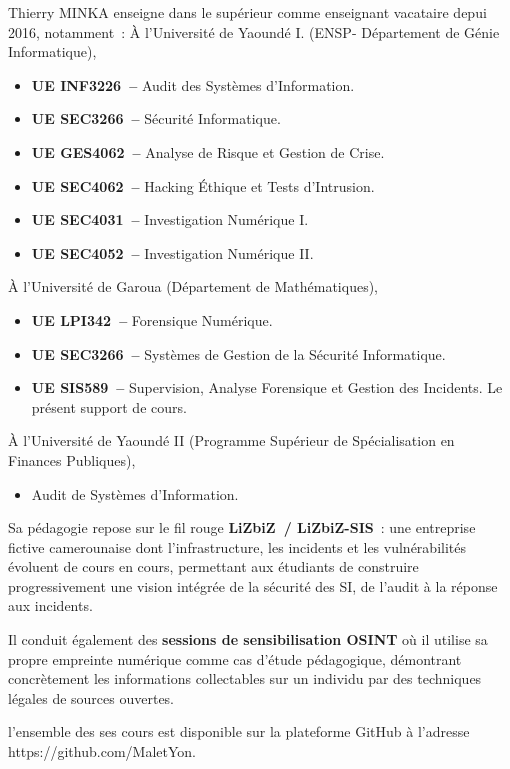 Thierry MINKA enseigne dans le supérieur comme enseignant vacataire depui 2016, notamment~:
À l'Université de Yaoundé I. (ENSP- Département de Génie Informatique), 
\begin{itemize}
  \item \textbf{UE INF3226~--} Audit des Systèmes d'Information.
  \item \textbf{UE SEC3266~--} Sécurité Informatique.
  \item \textbf{UE GES4062~--} Analyse de Risque et Gestion de Crise.
  \item \textbf{UE SEC4062~--} Hacking Éthique et Tests d'Intrusion.
  \item \textbf{UE SEC4031~--} Investigation Numérique I.
  \item \textbf{UE SEC4052~--} Investigation Numérique II.
  
\end{itemize}
À l'Université de Garoua (Département de Mathématiques), 
\begin{itemize}
  \item \textbf{UE LPI342~--} Forensique Numérique.
  \item \textbf{UE SEC3266~--} Systèmes de Gestion de la Sécurité Informatique.
  \item \textbf{UE SIS589~--} Supervision, Analyse Forensique et Gestion
        des Incidents. Le présent support de cours.
\end{itemize}

À l'Université de Yaoundé II (Programme Supérieur de Spécialisation en Finances Publiques), 
\begin{itemize}
  \item  Audit de Systèmes d'Information.

\end{itemize}

Sa pédagogie repose sur le fil rouge \textbf{LiZbiZ~/ LiZbiZ-SIS}~:
une entreprise fictive camerounaise dont l'infrastructure, les incidents
et les vulnérabilités évoluent de cours en cours, permettant aux étudiants
de construire progressivement une vision intégrée de la sécurité des SI,
de l'audit à la réponse aux incidents.

Il conduit également des \textbf{sessions de sensibilisation OSINT} où il
utilise sa propre empreinte numérique comme cas d'étude pédagogique,
démontrant concrètement les informations collectables sur un individu
par des techniques légales de sources ouvertes.

l'ensemble des ses cours est disponible sur la plateforme GitHub à l'adresse https://github.com/MaletYon.
